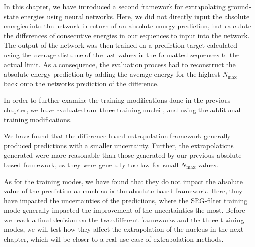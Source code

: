 In this chapter, we have introduced a second framework for extrapolating ground-state energies using neural networks. Here, we did not directly input the absolute energies into the network in return of an absolute energy prediction, but calculate the differences of consecutive energies in our sequences to input into the network. The output of the network was then trained on a prediction target calculated using the average distance of the last values in the formatted sequences to the actual limit. As a consequence, the evaluation process had to reconstruct the absolute energy prediction by adding the average energy for the highest $N_\mathrm{max}$ back onto the networks prediction of the difference.

In order to further examine the training modifications done in the previous chapter, we have evaluated our three training nuclei ,  and  using the additional training modifications.

We have found that the difference-based extrapolation framework generally produced predictions with a smaller uncertainty. Further, the extrapolations generated were more reasonable than those generated by our previous absolute-based framework, as they were generally too low for small $N_\mathrm{max}$ values.

As for the training modes, we have found that they do not impact the absolute value of the prediction as much as in the absolute-based framework. Here, they have impacted the uncertainties of the predictions, where the SRG-filter training mode generally impacted the improvement of the uncertainties the most.
Before we reach a final decision on the two different frameworks and the three training modes, we will test how they affect the extrapolation of the nucleus  in the next chapter, which will be closer to a real use-case of extrapolation methods.
